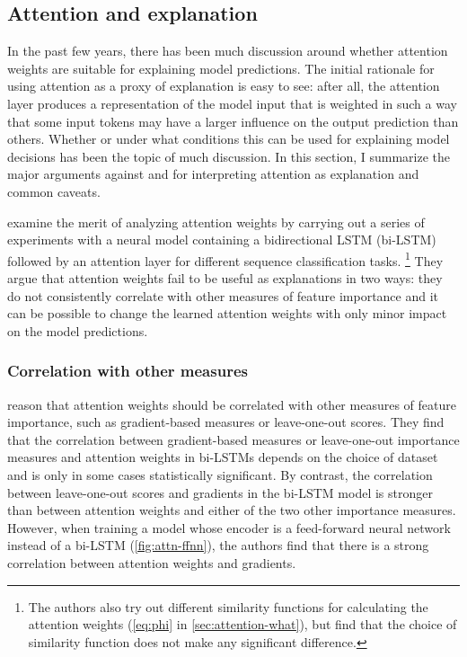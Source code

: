 \subsection{Attention and explanation}
\label{sec:attention-explanation}


In the past few years, there has been much discussion around whether attention weights are suitable for explaining model predictions.
The initial rationale for using attention as a proxy of explanation is easy to see: after all, the attention layer produces a representation of the model input that is weighted in such a way that some input tokens may have a larger influence on the output prediction than others.
Whether or under what conditions this can be used for explaining model decisions has been the topic of much discussion.
In this section, I summarize the major arguments against and for interpreting attention as explanation and common caveats.

\citet{jain2019attentionNotExplanation} examine the merit of analyzing attention weights by carrying out a series of experiments with a neural model containing a bidirectional LSTM (bi-LSTM) followed by an attention layer for different sequence classification tasks.%
\footnote{The authors also try out different similarity functions for calculating the attention weights (\autoref{eq:phi} in \autoref{sec:attention-what}), but find that the choice of similarity function does not make any significant difference.}
They argue that attention weights fail to be useful as explanations in two ways: they do not consistently correlate with other measures of feature importance and it can be possible to change the learned attention weights with only minor impact on the model predictions.

\subsubsection{Correlation with other measures}

\citet{jain2019attentionNotExplanation} reason that attention weights should be correlated with other measures of feature importance, such as gradient-based measures or leave-one-out scores.
They find that the correlation between gradient-based measures or leave-one-out importance measures and attention weights in bi-LSTMs depends on the choice of dataset and is only in some cases statistically significant.
By contrast, the correlation between leave-one-out scores and gradients in the bi-LSTM model is stronger than between attention weights and either of the two other importance measures.
However, when training a model whose encoder is a feed-forward neural network instead of a bi-LSTM (\autoref{fig:attn-ffnn}), the authors find that there is a strong correlation between attention weights and gradients.

